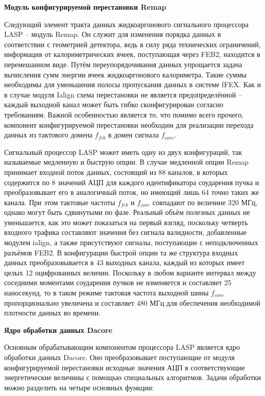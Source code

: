 \textbf{Модуль конфигурируемой перестановки Remap}\par
Следующий элемент тракта данных жидкоаргонового сигнального процессора LASP -- модуль Remap. Он служит для изменения порядка данных в соответствии с геометрией детектора, ведь в силу ряда технических ограничений, информация от калориметрических ячеек, поступающая через FEB2, находится в перемешанном виде. Путём переупорядочивания данных упрощается задача вычисления сумм энергии ячеек жидкоаргонового калориметра. Такие суммы необходимы для уменьшения полосы пропускания данных в системе fFEX. Как и в случае модуля Ialign схема перестановки не является предопределённой -- каждый выходной канал может быть гибко сконфигурирован согласно требованиям. Важной особенностью является то, что помимо всего прочего, компонент конфигурируемой перестановки необходим для реализации перехода данных из тактового домена $f_{feb}$ в домен сигнала $f_{core}$.\par
Сигнальный процессор LASP может иметь одну из двух конфигураций, так называемые медленную и быструю опции. В случае медленной опции Remap принимает входной поток данных, состоящий из 88 каналов, в которых содержится по 8 значений АЦП для каждого идентификатора соударения пучка и преобразовывает его в аналогичный поток, но имеющий лишь 64 точно таких же канала. При этом тактовые частоты $f_{feb}$ и $f_{core}$ совпадают по величине 320 МГц, однако могут быть сдвинутыми по фазе. Реальный объём полезных данных не уменьшается, как это может показаться на первый взгляд, поскольку четверть входного трафика составляют значения без сигнала валидности, добавленные модулем ialign, а также присутствуют сигналы, поступающие с неподключенных разъёмов FEB2. В конфигурации быстрой опции та же структура входных данных преобразовывается в 43 выходных канала, каждый из которых имеет целых 12 оцифрованных величин. Поскольку в любом варианте интервал между соседними моментами соударения пучков не изменяется и составляет 25 наносекунд, то в таком режиме тактовая частота выходной шины $f_{core}$ пропорционально увеличена и составляет 480 МГц для обеспечения необходимой плотности данных во времени.\par
\textbf{Ядро обработки данных Dacore}\par
Основным обрабатывающим компонентом процессора LASP является ядро обработки данных Dacore. Оно преобразовывает поступающие от модуля конфигурируемой перестановки исходные значения АЦП в соответствующие энергетические величины с помощью специальных алгоритмов. Задачи обработки можно разделить на четыре основных функции:\par
